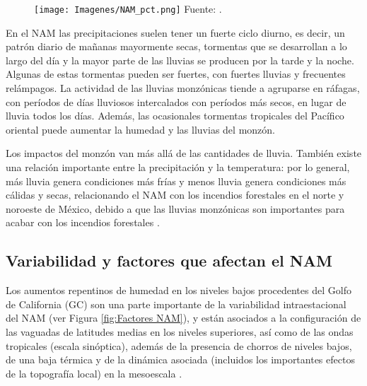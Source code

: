 \documentclass[12pt]{article}
\begin{document}
\begin{figure}[H]
	\begin{center}
 		\texttt{[image: Imagenes/NAM\_pct.png]}
 		Fuente: \cite{Climategov}.
	\end{center} 
\end{figure}

En el NAM las precipitaciones suelen tener un fuerte ciclo diurno, es decir, un patrón diario de mañanas mayormente secas, tormentas que se desarrollan a lo largo del día y la mayor parte de las lluvias se producen por la tarde y la noche. Algunas de estas tormentas pueden ser fuertes, con fuertes lluvias y frecuentes relámpagos. La actividad de las lluvias monzónicas tiende a agruparse en ráfagas, con períodos de días lluviosos intercalados con períodos más secos, en lugar de lluvia todos los días. Además, las ocasionales tormentas tropicales del Pacífico oriental puede aumentar la humedad y las lluvias del monzón.

Los impactos del monzón van más allá de las cantidades de lluvia. También existe una relación importante entre la precipitación y la temperatura: por lo general, más lluvia genera condiciones más frías y menos lluvia genera condiciones más cálidas y secas, relacionando el NAM con los incendios forestales en el norte y noroeste de México, debido a que las lluvias monzónicas son importantes para acabar con los incendios forestales \cite{Climategov}.

\subsection{Variabilidad y factores que afectan el NAM}

Los aumentos repentinos de humedad en los niveles bajos procedentes del Golfo de California (GC) son una parte importante de la variabilidad intraestacional del NAM (ver Figura \ref{fig:Factores NAM}), y están asociados a la configuración de las vaguadas de latitudes medias en los niveles superiores, así como de las ondas tropicales (escala sinóptica), además de la presencia de chorros de niveles bajos, de una baja térmica y de la dinámica asociada (incluidos los importantes efectos de la topografía local) en la mesoescala \cite{adams1997north}.
\end{document}
